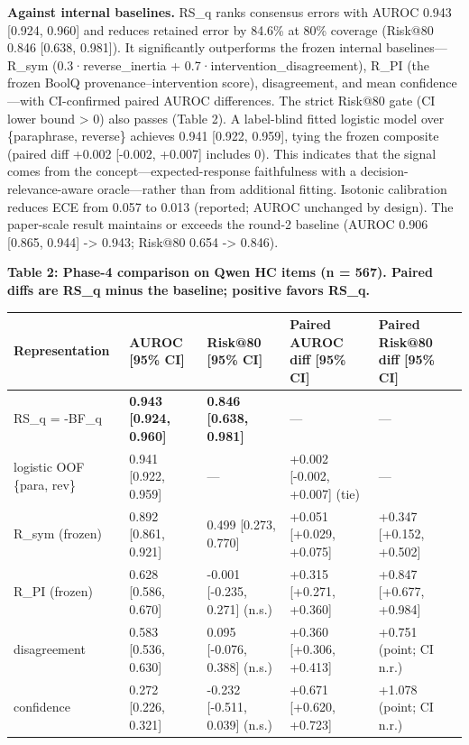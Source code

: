 \documentclass[11pt]{article}
\begin{document}
\textbf{Against internal baselines.} RS\_q ranks consensus errors with AUROC 0.943 [0.924, 0.960] and reduces retained error by 84.6\% at 80\% coverage (Risk@80 0.846 [0.638, 0.981]). It significantly outperforms the frozen internal baselines—R\_sym (0.3·reverse\_inertia + 0.7·intervention\_disagreement), R\_PI (the frozen BoolQ provenance–intervention score), disagreement, and mean confidence—with CI-confirmed paired AUROC differences. The strict Risk@80 gate (CI lower bound > 0) also passes (Table 2). A label-blind fitted logistic model over \{paraphrase, reverse\} achieves 0.941 [0.922, 0.959], tying the frozen composite (paired diff +0.002 [-0.002, +0.007] includes 0). This indicates that the signal comes from the concept—expected-response faithfulness with a decision-relevance-aware oracle—rather than from additional fitting. Isotonic calibration reduces ECE from 0.057 to 0.013 (reported; AUROC unchanged by design). The paper-scale result maintains or exceeds the round-2 baseline (AUROC 0.906 [0.865, 0.944] -> 0.943; Risk@80 0.654 -> 0.846).

\textbf{Table 2: Phase-4 comparison on Qwen HC items (n = 567). Paired diffs are RS\_q minus the baseline; positive favors RS\_q.}

\begin{table}[t]
\centering
\small
\begin{tabular}{lllll}
\toprule
Representation & AUROC [95\% CI] & Risk@80 [95\% CI] & Paired AUROC diff [95\% CI] & Paired Risk@80 diff [95\% CI] \\
\midrule
RS\_q = -BF\_q & \textbf{0.943 [0.924, 0.960]} & \textbf{0.846 [0.638, 0.981]} & — & — \\
logistic OOF \{para, rev\} & 0.941 [0.922, 0.959] & — & +0.002 [-0.002, +0.007] (tie) & — \\
R\_sym (frozen) & 0.892 [0.861, 0.921] & 0.499 [0.273, 0.770] & +0.051 [+0.029, +0.075] & +0.347 [+0.152, +0.502] \\
R\_PI (frozen) & 0.628 [0.586, 0.670] & -0.001 [-0.235, 0.271] (n.s.) & +0.315 [+0.271, +0.360] & +0.847 [+0.677, +0.984] \\
disagreement & 0.583 [0.536, 0.630] & 0.095 [-0.076, 0.388] (n.s.) & +0.360 [+0.306, +0.413] & +0.751 (point; CI n.r.) \\
confidence & 0.272 [0.226, 0.321] & -0.232 [-0.511, 0.039] (n.s.) & +0.671 [+0.620, +0.723] & +1.078 (point; CI n.r.) \\
\bottomrule
\end{tabular}
\end{table}
\end{document}
